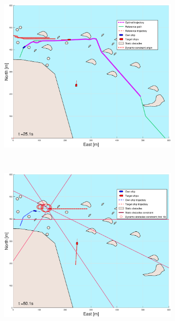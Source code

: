 \begin{figure}[!ht]
\begin{subfigure}[b]{0.494\textwidth}
        \includegraphics[width=\textwidth]{Images/Figures/skjergard_m_trafikk_NEW/_Simple_0fig999_time=25}
        \subcaption{}
    \end{subfigure}
    \hfill
    \\
    \begin{subfigure}[b]{0.494\textwidth}
        \centering
        \includegraphics[width=\textwidth]{Images/Figures/skjergard_m_trafikk_NEW/_Simple_0fig1_time=50}
        \subcaption{}
    \end{subfigure}

\end{figure}
